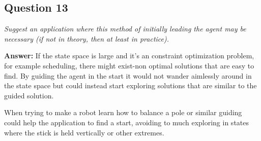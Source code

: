 \documentclass[a4paper]{article}
\begin{document}
\subsection*{Question 13}
\emph{Suggest an application where this method of initially leading the
agent may be necessary (if not in theory, then at least in practice).}

\textbf{Answer:} If the state space is large and it's an constraint optimization problem, for example scheduling, there might exist-non optimal solutions that are easy to find. By guiding the agent in the start it would not wander aimlessly around in the state space but could instead start exploring solutions that are similar to the guided solution. 

When trying to make a robot learn how to balance a pole or similar guiding could help the application to find a start, avoiding to much exploring in states where the stick is held vertically or other extremes.
\end{document}
